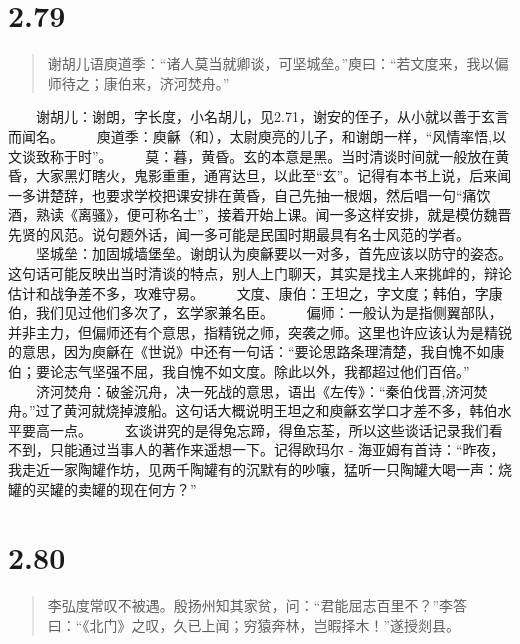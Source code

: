 \documentclass[]{book}
\begin{document}
\section{2.79}\label{section-125}

\begin{quote}
谢胡儿语庾道季：``诸人莫当就卿谈，可坚城垒。''庾曰：``若文度来，我以偏师待之；康伯来，济河焚舟。''
\end{quote}

　　谢胡儿：谢朗，字长度，小名胡儿，见2.71，谢安的侄子，从小就以善于玄言而闻名。
　　庾道季：庾龢（和），太尉庾亮的儿子，和谢朗一样，``风情率悟,以文谈致称于时''。
　　莫：暮，黄昏。玄的本意是黑。当时清谈时间就一般放在黄昏，大家黑灯瞎火，鬼影重重，通宵达旦，以此至``玄''。记得有本书上说，后来闻一多讲楚辞，也要求学校把课安排在黄昏，自己先抽一根烟，然后唱一句``痛饮酒，熟读《离骚》，便可称名士''，接着开始上课。闻一多这样安排，就是模仿魏晋先贤的风范。说句题外话，闻一多可能是民国时期最具有名士风范的学者。
　　坚城垒：加固城墙堡垒。谢朗认为庾龢要以一对多，首先应该以防守的姿态。这句话可能反映出当时清谈的特点，别人上门聊天，其实是找主人来挑衅的，辩论估计和战争差不多，攻难守易。
　　文度、康伯：王坦之，字文度；韩伯，字康伯，我们见过他们多次了，玄学家兼名臣。
　　偏师：一般认为是指侧翼部队，并非主力，但偏师还有个意思，指精锐之师，突袭之师。这里也许应该认为是精锐的意思，因为庾龢在《世说》中还有一句话：``要论思路条理清楚，我自愧不如康伯；要论志气坚强不屈，我自愧不如文度。除此以外，我都超过他们百倍。''
　　济河焚舟：破釜沉舟，决一死战的意思，语出《左传》：``秦伯伐晋,济河焚舟。''过了黄河就烧掉渡船。这句话大概说明王坦之和庾龢玄学口才差不多，韩伯水平要高一点。
　　玄谈讲究的是得兔忘蹄，得鱼忘荃，所以这些谈话记录我们看不到，只能通过当事人的著作来遥想一下。记得欧玛尔
-
海亚姆有首诗：``昨夜，我走近一家陶罐作坊，见两千陶罐有的沉默有的吵嚷，猛听一只陶罐大喝一声：烧罐的买罐的卖罐的现在何方？''

\section{2.80}\label{section-126}

\begin{quote}
李弘度常叹不被遇。殷扬州知其家贫，问：``君能屈志百里不？''李答曰：``《北门》之叹，久已上闻；穷猿奔林，岂暇择木！''遂授剡县。
\end{quote}
\end{document}
